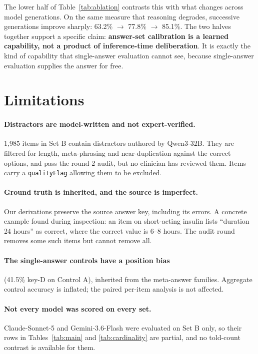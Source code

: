 \documentclass{article} %
\begin{document}
The lower half of Table~\ref{tab:ablation} contrasts this with what changes across model
generations. On the same measure that reasoning degrades, successive generations improve
sharply: 63.2\% $\to$ 77.8\% $\to$ 85.1\%. The two halves together support a specific
claim: \textbf{answer-set calibration is a learned capability, not a product of
inference-time deliberation}. It is exactly the kind of capability that single-answer
evaluation cannot see, because single-answer evaluation supplies the answer for free.

\section{Limitations}

\paragraph{Distractors are model-written and not expert-verified.} 1,985 items in Set B
contain distractors authored by Qwen3-32B. They are filtered for length, meta-phrasing and
near-duplication against the correct options, and pass the round-2 audit, but no clinician
has reviewed them. Items carry a \texttt{qualityFlag} allowing them to be excluded.

\paragraph{Ground truth is inherited, and the source is imperfect.} Our derivations
preserve the source answer key, including its errors. A concrete example found during
inspection: an item on short-acting insulin lists ``duration 24 hours'' as correct, where
the correct value is 6--8 hours. The audit round removes some such items but cannot remove
all.

\paragraph{The single-answer controls have a position bias} (41.5\% key-D on Control A),
inherited from the meta-answer families. Aggregate control accuracy is inflated; the paired
per-item analysis is not affected.

\paragraph{Not every model was scored on every set.} Claude-Sonnet-5 and Gemini-3.6-Flash
were evaluated on Set B only, so their rows in Tables~\ref{tab:main} and
\ref{tab:cardinality} are partial, and no told-count contrast is available for them.
\end{document}
